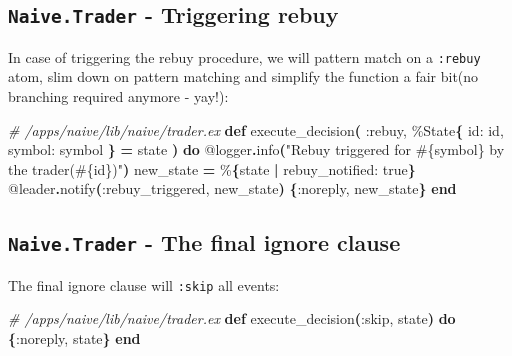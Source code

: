 \documentclass[
  oneside]{book}
\newenvironment{Shaded}{\begin{snugshade}}{\end{snugshade}}
\newcommand{\CommentTok}[1]{\textcolor[rgb]{0.56,0.35,0.01}{\textit{#1}}}
\newcommand{\ConstantTok}[1]{\textcolor[rgb]{0.56,0.35,0.01}{#1}}
\newcommand{\FunctionTok}[1]{\textcolor[rgb]{0.13,0.29,0.53}{\textbf{#1}}}
\newcommand{\KeywordTok}[1]{\textcolor[rgb]{0.13,0.29,0.53}{\textbf{#1}}}
\newcommand{\NormalTok}[1]{#1}
\newcommand{\OperatorTok}[1]{\textcolor[rgb]{0.81,0.36,0.00}{\textbf{#1}}}
\newcommand{\OtherTok}[1]{\textcolor[rgb]{0.56,0.35,0.01}{#1}}
\newcommand{\StringTok}[1]{\textcolor[rgb]{0.31,0.60,0.02}{#1}}
\newcommand{\VariableTok}[1]{\textcolor[rgb]{0.00,0.00,0.00}{#1}}
\begin{document}
\subsection{\texorpdfstring{\texttt{Naive.Trader} - Triggering rebuy}{Naive.Trader - Triggering rebuy}}\label{naive.trader---triggering-rebuy}

In case of triggering the rebuy procedure, we will pattern match on a \texttt{:rebuy} atom, slim down on pattern matching and simplify the function a fair bit(no branching required anymore - yay!):

\begin{Shaded}
\begin{Highlighting}[]
\CommentTok{\# /apps/naive/lib/naive/trader.ex}
  \KeywordTok{def}\NormalTok{ execute\_decision}\FunctionTok{(}
         \VariableTok{:rebuy}\NormalTok{,}
\NormalTok{         \%}\ConstantTok{State}\FunctionTok{\{}
           \VariableTok{id:}\NormalTok{ id,}
           \VariableTok{symbol:}\NormalTok{ symbol}
         \FunctionTok{\}} \OperatorTok{=}\NormalTok{ state}
       \FunctionTok{)} \KeywordTok{do}
    \OtherTok{@logger}\OperatorTok{.}\NormalTok{info}\FunctionTok{(}\StringTok{"Rebuy triggered for }\OtherTok{\#\{}\NormalTok{symbol}\OtherTok{\}}\StringTok{ by the trader(}\OtherTok{\#\{}\NormalTok{id}\OtherTok{\}}\StringTok{)"}\FunctionTok{)}
\NormalTok{    new\_state }\OperatorTok{=}\NormalTok{ \%}\FunctionTok{\{}\NormalTok{state }\OperatorTok{|} \VariableTok{rebuy\_notified:} \ConstantTok{true}\FunctionTok{\}}
    \OtherTok{@leader}\OperatorTok{.}\NormalTok{notify}\FunctionTok{(}\VariableTok{:rebuy\_triggered}\NormalTok{, new\_state}\FunctionTok{)}
    \FunctionTok{\{}\VariableTok{:noreply}\NormalTok{, new\_state}\FunctionTok{\}}
  \KeywordTok{end}
\end{Highlighting}
\end{Shaded}

\subsection{\texorpdfstring{\texttt{Naive.Trader} - The final ignore clause}{Naive.Trader - The final ignore clause}}\label{naive.trader---the-final-ignore-clause}

The final ignore clause will \texttt{:skip} all events:

\begin{Shaded}
\begin{Highlighting}[]
\CommentTok{\# /apps/naive/lib/naive/trader.ex}
  \KeywordTok{def}\NormalTok{ execute\_decision}\FunctionTok{(}\VariableTok{:skip}\NormalTok{, state}\FunctionTok{)} \KeywordTok{do}
    \FunctionTok{\{}\VariableTok{:noreply}\NormalTok{, state}\FunctionTok{\}}
  \KeywordTok{end}
\end{Highlighting}
\end{Shaded}
\end{document}
